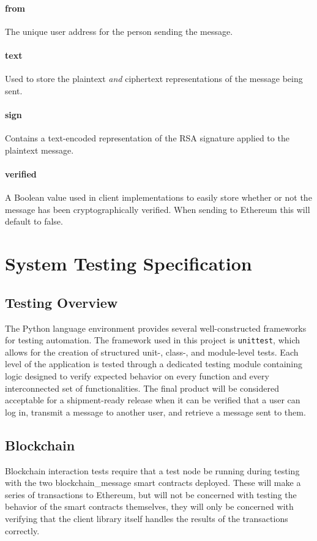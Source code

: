 \documentclass[titlepage]{report}
\begin{document}
\subsubsection{from}
The unique user address for the person sending the message.

\subsubsection{text}
Used to store the plaintext \textit{and} ciphertext representations of the message being sent.

\subsubsection{sign}
Contains a text-encoded representation of the RSA signature applied to the plaintext message.

\subsubsection{verified}
A Boolean value used in client implementations to easily store whether or not the message has been cryptographically verified. When sending to \gls{Ethereum} this will default to false.

\chapter{System Testing Specification}
\section{Testing Overview}
The Python language environment provides several well-constructed frameworks for testing automation. The framework used in this project is \texttt{unittest}\cite{unittest}, which allows for the creation of structured unit-, class-, and module-level tests. Each level of the application is tested through a dedicated testing module containing logic designed to verify expected behavior on every function and every interconnected set of functionalities. The final product will be considered acceptable for a shipment-ready release when it can be verified that a user can log in, transmit a message to another user, and retrieve a message sent to them.

\section{Blockchain}
Blockchain interaction tests require that a test \gls{node} be running during testing with the two blockchain\_message \glspl{smart contract} deployed. These will make a series of transactions to \gls{Ethereum}, but will not be concerned with testing the behavior of the \glspl{smart contract} themselves, they will only be concerned with verifying that the client library itself handles the results of the transactions correctly.
\end{document}
